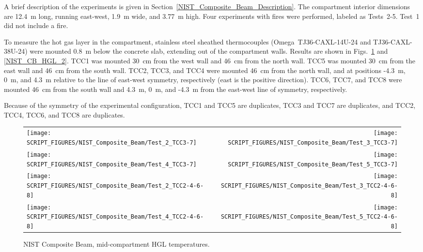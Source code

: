 A brief description of the experiments is given in Section~\ref{NIST_Composite_Beam_Description}. The compartment interior dimensions are 12.4~m long, running east-west, 1.9~m wide, and 3.77~m high. Four experiments with fires were performed, labeled as Tests~2-5. Test~1 did not include a fire.

To measure the hot gas layer in the compartment, stainless steel sheathed thermocouples (Omega~TJ36-CAXL-14U-24 and TJ36-CAXL-38U-24) were mounted 0.8~m below the concrete slab, extending out of the compartment walls. Results are shown in Figs.~\ref{NIST_CB_HGL_1} and \ref{NIST_CB_HGL_2}. TCC1 was mounted 30~cm from the west wall and 46~cm from the north wall. TCC5 was mounted 30~cm from the east wall and 46~cm from the south wall. TCC2, TCC3, and TCC4 were mounted 46~cm from the north wall, and at positions -4.3~m, 0~m, and 4.3~m relative to the line of east-west symmetry, respectively (east is the positive direction). TCC6, TCC7, and TCC8 were mounted 46~cm from the south wall and 4.3~m, 0~m, and -4.3~m from the east-west line of symmetry, respectively.

Because of the symmetry of the experimental configuration, TCC1 and TCC5 are duplicates, TCC3 and TCC7 are duplicates, and TCC2, TCC4, TCC6, and TCC8 are duplicates.


\newpage

\begin{figure}[p]
\begin{tabular*}{\textwidth}{l@{\extracolsep{\fill}}r}
\texttt{[image: SCRIPT\_FIGURES/NIST\_Composite\_Beam/Test\_2\_TCC3-7]} &
\texttt{[image: SCRIPT\_FIGURES/NIST\_Composite\_Beam/Test\_3\_TCC3-7]} \\
\texttt{[image: SCRIPT\_FIGURES/NIST\_Composite\_Beam/Test\_4\_TCC3-7]} &
\texttt{[image: SCRIPT\_FIGURES/NIST\_Composite\_Beam/Test\_5\_TCC3-7]} \\
\texttt{[image: SCRIPT\_FIGURES/NIST\_Composite\_Beam/Test\_2\_TCC2-4-6-8]} &
\texttt{[image: SCRIPT\_FIGURES/NIST\_Composite\_Beam/Test\_3\_TCC2-4-6-8]} \\
\texttt{[image: SCRIPT\_FIGURES/NIST\_Composite\_Beam/Test\_4\_TCC2-4-6-8]} &
\texttt{[image: SCRIPT\_FIGURES/NIST\_Composite\_Beam/Test\_5\_TCC2-4-6-8]}
\end{tabular*}
\caption[NIST Composite Beam, mid-compartment HGL temperatures]
{NIST Composite Beam, mid-compartment HGL temperatures.}
\label{NIST_CB_HGL_1}
\end{figure}

